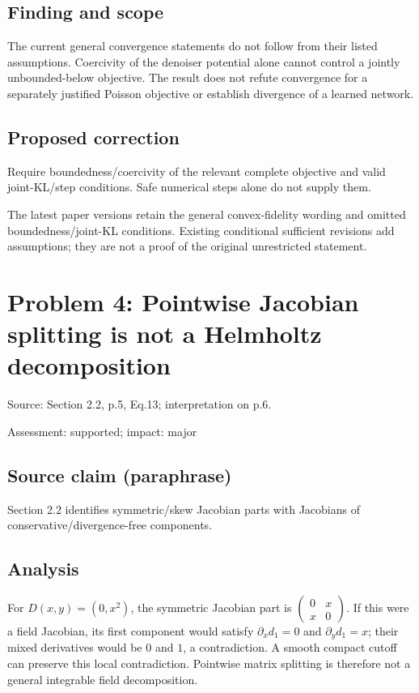 \documentclass[11pt]{article}
\begin{document}
\subsection*{Finding and scope}

The current general convergence statements do not follow from their listed assumptions. Coercivity of the denoiser potential alone cannot control a jointly unbounded-below objective. The result does not refute convergence for a separately justified Poisson objective or establish divergence of a learned network.

\subsection*{Proposed correction}

Require boundedness/coercivity of the relevant complete objective and valid joint-KL/step conditions. Safe numerical steps alone do not supply them.

The latest paper versions retain the general convex-fidelity wording and omitted boundedness/joint-KL conditions. Existing conditional sufficient revisions add assumptions; they are not a proof of the original unrestricted statement.

\section*{Problem 4: Pointwise Jacobian splitting is not a Helmholtz decomposition}

Source: Section 2.2, p.5, Eq.13; interpretation on p.6.

Assessment: supported; impact: major

\subsection*{Source claim (paraphrase)}

Section 2.2 identifies symmetric/skew Jacobian parts with Jacobians of conservative/divergence-free components.

\subsection*{Analysis}

For \(D(x,y)=(0,x^2)\), the symmetric Jacobian part is \(\begin{pmatrix}0&x\\x&0\end{pmatrix}\). If this were a field Jacobian, its first component would satisfy \(\partial_x d_1=0\) and \(\partial_y d_1=x\); their mixed derivatives would be \(0\) and \(1\), a contradiction. A smooth compact cutoff can preserve this local contradiction. Pointwise matrix splitting is therefore not a general integrable field decomposition.
\end{document}
